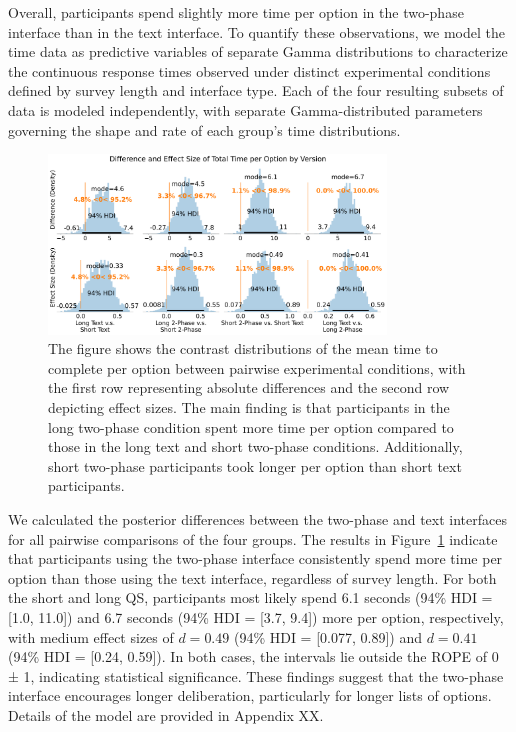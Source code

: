 Overall, participants spend slightly more time per option in the two-phase interface than in the text interface. To quantify these observations, we model the time data as predictive variables of separate Gamma distributions to characterize the continuous response times observed under distinct experimental conditions defined by survey length and interface type. Each of the four resulting subsets of data is modeled independently, with separate Gamma-distributed parameters governing the shape and rate of each group's time distributions. 

\begin{figure}[h]
    \centering
    \includegraphics[width=0.8\textwidth]{content/image/time/time_diff_per_option_effect_size_by_version}
    \captionsetup{width=0.8\textwidth, justification=justified}
    \caption{The figure shows the contrast distributions of the mean time to complete per option between pairwise experimental conditions, with the first row representing absolute differences and the second row depicting effect sizes. The main finding is that participants in the long two-phase condition spent more time per option compared to those in the long text and short two-phase conditions. Additionally, short two-phase participants took longer per option than short text participants.}
    \label{fig:time_per_option_bayesian}
\end{figure}

We calculated the posterior differences between the two-phase and text interfaces for all pairwise comparisons of the four groups. The results in Figure~\ref{fig:time_per_option_bayesian} indicate that participants using the two-phase interface consistently spend more time per option than those using the text interface, regardless of survey length. For both the short and long QS, participants most likely spend 6.1 seconds (94\% HDI = [1.0, 11.0]) and 6.7 seconds (94\% HDI = [3.7, 9.4]) more per option, respectively, with medium effect sizes of $d=0.49$ (94\% HDI = [0.077, 0.89]) and $d=0.41$ (94\% HDI = [0.24, 0.59]). In both cases, the intervals lie outside the ROPE of 0 ± 1, indicating statistical significance. These findings suggest that the two-phase interface encourages longer deliberation, particularly for longer lists of options. Details of the model are provided in Appendix XX.

